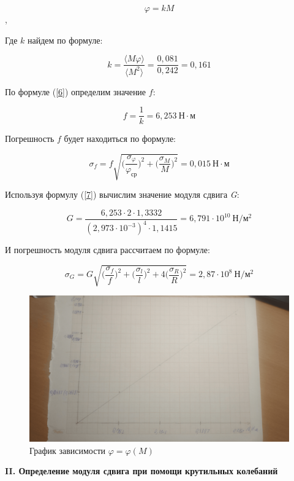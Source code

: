 \documentclass[12pt,a4paper]{article}
\begin{document}
\[\varphi = k\textit{M}\],

Где $k$ найдем по формуле:

\[k = \frac{\langle M \varphi \rangle}{\langle M^2 \rangle} = \frac{0,081}{0,242} = 0,161 \]

По формуле (\ref{6}) определим значение $\textit{f}$:

\[\textit{f} = \frac{1}{k} = 6,253 \: \text{Н} \cdot \text{м}\]

Погрешность $\textit{f}$ будет находиться по формуле:

\[\sigma_{\textit{f}} = \textit{f}\sqrt{\Big(\frac{\sigma_{\varphi}}{\varphi_{\text{ср}}}\Big)^2 + \Big(\frac{\sigma_{M}}{M}\Big)^2} = 0,015 \: \text{Н} \cdot \text{м}\]

Используя формулу (\ref{7}) вычислим значение модуля сдвига \textit{G}:

\[\textit{G} = \frac{6,253 \cdot 2 \cdot 1,3332}{(2,973 \cdot 10^{-3})^4 \cdot 1,1415} = 6,791 \cdot 10^{10} \: \text{Н}/\text{м}^2\]

И погрешность модуля сдвига рассчитаем по формуле:

\[\sigma_{\textit{G}} = \textit{G}\sqrt{\Big(\frac{\sigma_{\textit{f}}}{\textit{f}}\Big)^2 + \Big(\frac{\sigma_{\textit{l}}}{\textit{l}}\Big)^2 + 4\Big(\frac{\sigma_{\textit{R}}}{\textit{R}}\Big)^2} = 2,87 \cdot 10^8 \: \text{Н}/\text{м}^2\]

\begin{figure}[h!]
\centering
\includegraphics[scale=0.1]{Image2.png}
\caption{График зависимости $\varphi = \varphi(\textit{M})$}
\label{fig:Image1}
\end{figure}

\begin{center}
    \large
    \textbf{II. Определение модуля сдвига при помощи крутильных колебаний}
\end{center}    
\end{document}
